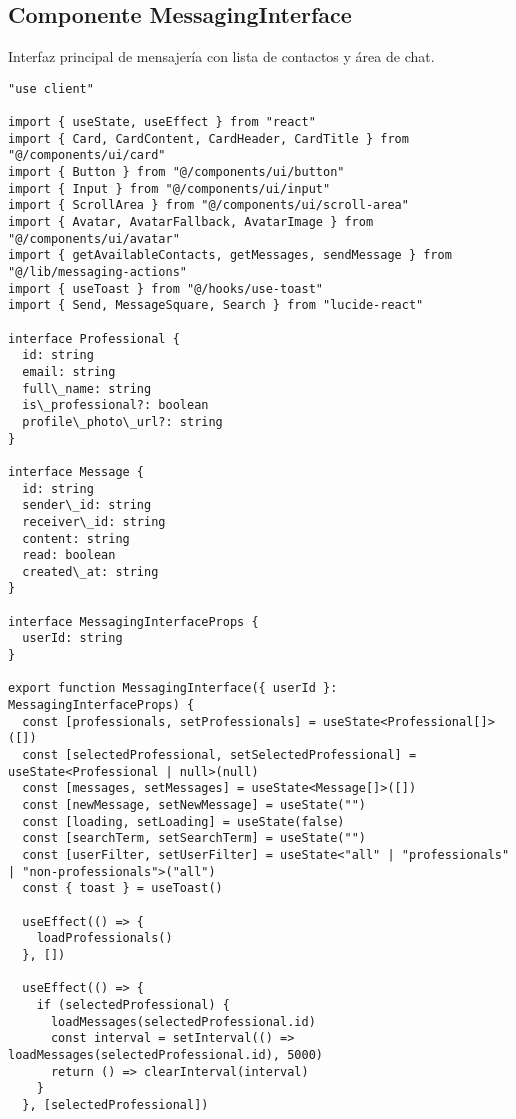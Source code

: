 \documentclass[12pt,a4paper]{article}
\begin{document}
\subsection{Componente MessagingInterface}

Interfaz principal de mensajería con lista de contactos y área de chat.

\begin{lstlisting}[caption=components/messaging/messaging-interface.tsx - Estructura principal]
"use client"

import { useState, useEffect } from "react"
import { Card, CardContent, CardHeader, CardTitle } from "@/components/ui/card"
import { Button } from "@/components/ui/button"
import { Input } from "@/components/ui/input"
import { ScrollArea } from "@/components/ui/scroll-area"
import { Avatar, AvatarFallback, AvatarImage } from "@/components/ui/avatar"
import { getAvailableContacts, getMessages, sendMessage } from "@/lib/messaging-actions"
import { useToast } from "@/hooks/use-toast"
import { Send, MessageSquare, Search } from "lucide-react"

interface Professional {
  id: string
  email: string
  full\_name: string
  is\_professional?: boolean
  profile\_photo\_url?: string
}

interface Message {
  id: string
  sender\_id: string
  receiver\_id: string
  content: string
  read: boolean
  created\_at: string
}

interface MessagingInterfaceProps {
  userId: string
}

export function MessagingInterface({ userId }: MessagingInterfaceProps) {
  const [professionals, setProfessionals] = useState<Professional[]>([])
  const [selectedProfessional, setSelectedProfessional] = useState<Professional | null>(null)
  const [messages, setMessages] = useState<Message[]>([])
  const [newMessage, setNewMessage] = useState("")
  const [loading, setLoading] = useState(false)
  const [searchTerm, setSearchTerm] = useState("")
  const [userFilter, setUserFilter] = useState<"all" | "professionals" | "non-professionals">("all")
  const { toast } = useToast()

  useEffect(() => {
    loadProfessionals()
  }, [])

  useEffect(() => {
    if (selectedProfessional) {
      loadMessages(selectedProfessional.id)
      const interval = setInterval(() => loadMessages(selectedProfessional.id), 5000)
      return () => clearInterval(interval)
    }
  }, [selectedProfessional])


\end{lstlisting}
\end{document}
